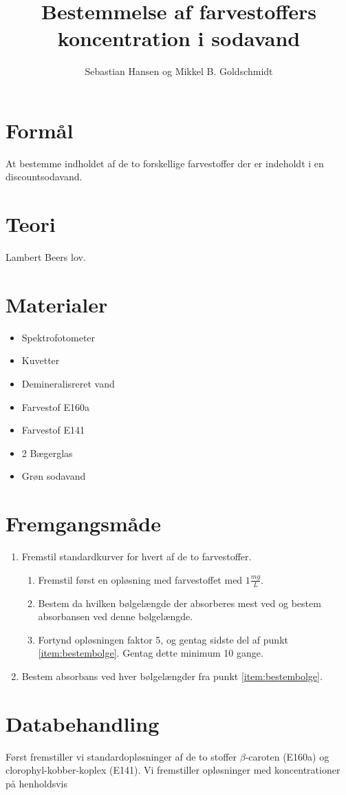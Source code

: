 \documentclass[10pt,a4paper]{article}
\author{Sebastian Hansen og Mikkel B. Goldschmidt}
\title{Bestemmelse af farvestoffers koncentration i sodavand}
\begin{document}
\maketitle

\section{Formål}
At bestemme indholdet af de to forskellige farvestoffer der er indeholdt i en discountsodavand.

\section{Teori}
Lambert Beers lov. 

\section{Materialer}
\begin{itemize}
	\item Spektrofotometer
	\item Kuvetter
	\item Demineralisreret vand
	\item Farvestof E160a
	\item Farvestof E141
	\item 2 Bægerglas
	\item Grøn sodavand
\end{itemize}


\section{Fremgangsmåde}

\begin{enumerate}
	\item Fremstil standardkurver for hvert af de to farvestoffer.
		\begin{enumerate}
			\item Fremstil først en opløsning med farvestoffet med $1\frac{mg}{L}$.
			\item Bestem da hvilken bølgelængde der absorberes mest ved og bestem absorbansen ved denne bølgelængde.\label{item:bestembolge}
			\item Fortynd opløsningen faktor 5, og gentag sidste del af punkt \ref{item:bestembolge}. Gentag dette minimum 10 gange.
		\end{enumerate}
	\item Bestem absorbans ved hver bølgelængder fra punkt \ref{item:bestembolge}.
\end{enumerate}

\section{Databehandling}
Først fremstiller vi standardopløsninger af de to stoffer $\beta$-caroten (E160a) og clorophyl-kobber-koplex (E141). Vi fremstiller opløsninger med koncentrationer på henholdsvis
\pagebreak
\end{document}
